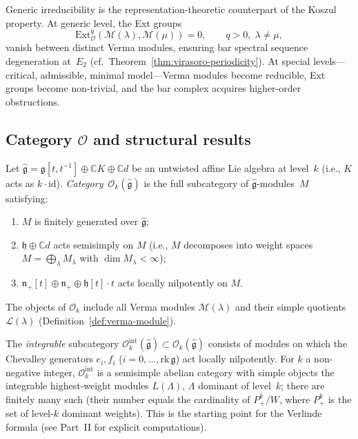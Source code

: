 \begin{remark}\label{rem:verma-koszul}
Generic irreducibility is the representation-theoretic
counterpart of the Koszul property.  At generic level, the Ext groups
\[
\mathrm{Ext}^q_{\mathcal{O}}(\mathcal{M}(\lambda),
\mathcal{M}(\mu)) = 0, \qquad q > 0,\; \lambda \neq \mu,
\]
vanish between distinct Verma modules, ensuring bar spectral sequence
degeneration at~$E_2$ (cf.\ Theorem~\ref{thm:virasoro-periodicity}).
At special levels---critical, admissible, minimal model---Verma modules
become reducible, Ext groups become non-trivial, and the bar complex
acquires higher-order obstructions.
\end{remark}

\subsection{Category \texorpdfstring{$\mathcal{O}$}{O} and structural results}

\begin{definition}
\label{def:category-O}
Let $\widehat{\mathfrak{g}} = \mathfrak{g}[t,t^{-1}] \oplus
\mathbb{C}K \oplus \mathbb{C}d$ be an untwisted affine Lie algebra at
level~$k$ (i.e., $K$ acts as $k \cdot \mathrm{id}$).
\emph{Category~$\mathcal{O}_k(\widehat{\mathfrak{g}})$} is the full
subcategory of $\widehat{\mathfrak{g}}$-modules~$M$ satisfying:
\begin{enumerate}[label=\textup{(\roman*)}]
\item $M$ is finitely generated over $\widehat{\mathfrak{g}}$;
\item $\mathfrak{h} \oplus \mathbb{C}d$ acts semisimply on $M$
  (i.e., $M$ decomposes into weight spaces
  $M = \bigoplus_{\lambda} M_\lambda$
  with $\dim M_\lambda < \infty$);
\item $\mathfrak{n}_+[t] \oplus \mathfrak{n}_+ \oplus
  \mathfrak{h}[t] \cdot t$ acts locally nilpotently on $M$.
\end{enumerate}
The objects of $\mathcal{O}_k$ include all Verma modules
$\mathcal{M}(\lambda)$ and their simple quotients
$\mathcal{L}(\lambda)$ (Definition~\ref{def:verma-module}).
\end{definition}

\begin{definition}
\label{def:integrable-modules}
The \emph{integrable} subcategory
$\mathcal{O}_k^{\mathrm{int}}(\widehat{\mathfrak{g}})
\subset \mathcal{O}_k(\widehat{\mathfrak{g}})$
consists of modules on which the Chevalley generators
$e_i, f_i$ ($i = 0, \ldots, \mathrm{rk}\,\mathfrak{g}$) act locally
nilpotently.  For $k$ a non-negative integer,
$\mathcal{O}_k^{\mathrm{int}}$ is a semisimple abelian category with
simple objects the integrable highest-weight modules
$L(\Lambda)$, $\Lambda$ dominant of level~$k$; there are finitely many
such (their number equals the cardinality of $P^k_+ / W$, where
$P^k_+$ is the set of level-$k$ dominant weights).  This is the
starting point for the Verlinde formula
(see Part~II for explicit computations).
\end{definition}

